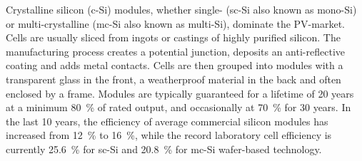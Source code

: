 Crystalline silicon (c-Si) modules, whether single- (sc-Si also known as mono-Si) or multi-crystalline (mc-Si also known as multi-Si), dominate the PV-market. Cells are usually sliced from ingots or castings of highly purified silicon. The manufacturing process creates a potential junction, deposits an anti-reflective coating and adds metal contacts. Cells are then grouped into modules with a transparent glass in the front, a weatherproof material in the back and often enclosed by a frame. Modules are typically guaranteed for a lifetime of 20 years at a minimum \SI{80}{\percent} of rated output, and occasionally at \SI{70}{\percent} for 30 years. In the last 10 years, the efficiency of average commercial silicon modules has increased from \SI{12}{\percent} to \SI{16}{\percent}, while the record laboratory cell efficiency is currently \SI{25.6}{\percent} for sc-Si and \SI{20.8}{\percent} for mc-Si wafer-based technology. \cite{FraunhoferISE2015}


